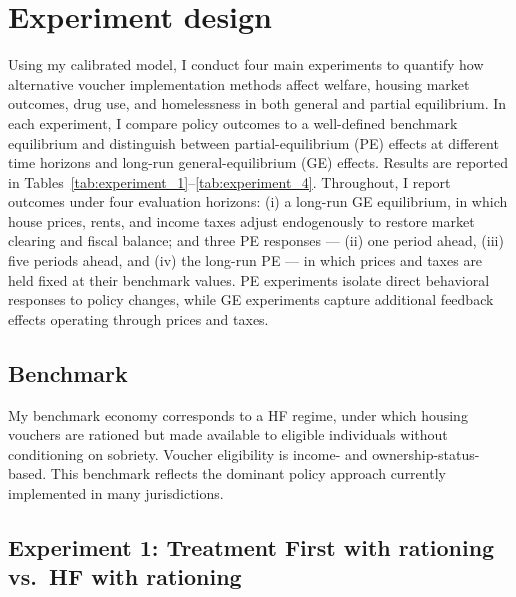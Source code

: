 \documentclass[parskip=full]{article}
\theoremstyle{plain}
\theoremstyle{definition}
\theoremstyle{remark}
\begin{document}
\section{Experiment design}\label{section:experiments}

Using my calibrated model, I conduct four main experiments to quantify how alternative voucher implementation methods affect welfare, housing market outcomes, drug use, and homelessness in both general and partial equilibrium. In each experiment, I compare policy outcomes to a well-defined benchmark equilibrium and distinguish between partial-equilibrium (PE) effects at different time horizons and long-run general-equilibrium (GE) effects. Results are reported in Tables~\ref{tab:experiment_1}--\ref{tab:experiment_4}. Throughout, I report outcomes under four evaluation horizons: (i) a long-run GE equilibrium, in which house prices, rents, and income taxes adjust endogenously to restore market clearing and fiscal balance; and three PE responses — (ii) one period
ahead, (iii) five periods ahead, and (iv) the long-run PE — in which prices and taxes are held fixed at their benchmark values. PE experiments isolate direct behavioral responses to policy changes, while GE experiments capture additional feedback effects operating through prices and taxes.

\subsection{Benchmark}

My benchmark economy corresponds to a HF regime, under which housing vouchers are rationed but made available to eligible individuals without conditioning on sobriety. Voucher eligibility is income- and ownership-status-based. This benchmark reflects the dominant policy approach currently implemented in many jurisdictions.

\subsection{Experiment 1: Treatment First with rationing vs.\ HF with rationing}
\end{document}

